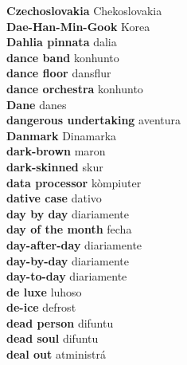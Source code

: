 \textbf{ Czechoslovakia  } Chekoslovakia \\
\textbf{ Dae-Han-Min-Gook  } Korea \\
\textbf{ Dahlia pinnata  } dalia \\
\textbf{ dance band  } konhunto \\
\textbf{ dance floor  } dansflur \\
\textbf{ dance orchestra  } konhunto \\
\textbf{ Dane  } danes \\
\textbf{ dangerous undertaking  } aventura \\
\textbf{ Danmark  } Dinamarka \\
\textbf{ dark-brown  } maron \\
\textbf{ dark-skinned  } skur \\
\textbf{ data processor  } kòmpiuter \\
\textbf{ dative case  } dativo \\
\textbf{ day by day  } diariamente \\
\textbf{ day of the month  } fecha \\
\textbf{ day-after-day  } diariamente \\
\textbf{ day-by-day  } diariamente \\
\textbf{ day-to-day  } diariamente \\
\textbf{ de luxe  } luhoso \\
\textbf{ de-ice  } defrost \\
\textbf{ dead person  } difuntu \\
\textbf{ dead soul  } difuntu \\
\textbf{ deal out  } atministrá \\
